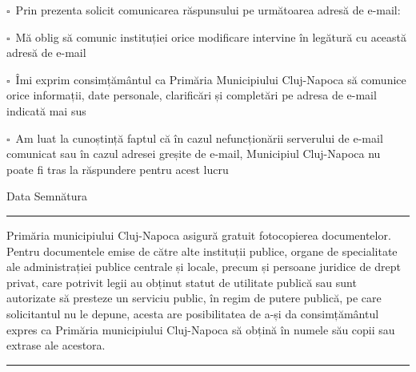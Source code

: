 \documentclass[11pt,a4paper]{article}
\newcommand{\fillline}[1][6cm]{\underline{\hspace{#1}}}
\newcommand{\checkboxempty}{$\square$}
\begin{document}
\vspace{0.5cm}

\checkboxempty\ Prin prezenta solicit comunicarea răspunsului pe următoarea adresă de e-mail:

\vspace{0.2cm}

\fillline[14cm]

\vspace{0.4cm}

\checkboxempty\ Mă oblig să comunic instituției orice modificare intervine în legătură cu această adresă de e-mail

\checkboxempty\ Îmi exprim consimțământul ca Primăria Municipiului Cluj-Napoca să comunice orice informații, date personale, clarificări și completări pe adresa de e-mail indicată mai sus

\checkboxempty\ Am luat la cunoștință faptul că în cazul nefuncționării serverului de e-mail comunicat sau în cazul adresei greșite de e-mail, Municipiul Cluj-Napoca nu poate fi tras la răspundere pentru acest lucru

\vspace{1cm}

\hspace{1cm}Data \hfill Semnătura\hspace{2cm}

\vspace{0.3cm}

\hspace{1cm}\fillline[4cm] \hfill \fillline[5cm]\hspace{1cm}

\vspace{0.6cm}

\hrule
\vspace{0.2cm}

{\footnotesize
Primăria municipiului Cluj-Napoca asigură gratuit fotocopierea documentelor.
Pentru documentele emise de către alte instituții publice, organe de specialitate ale administrației publice centrale și locale, precum și persoane juridice de drept privat, care potrivit legii au obținut statut de utilitate publică sau sunt autorizate să presteze un serviciu public, în regim de putere publică, pe care solicitantul nu le depune, acesta are posibilitatea de a-și da consimțământul expres ca Primăria municipiului Cluj-Napoca să obțină în numele său copii sau extrase ale acestora.
}

\vfill
\hrule
\vspace{0.3cm}
\end{document}
